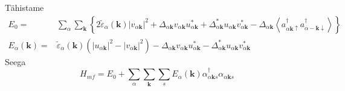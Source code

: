 \documentclass[class=article, crop=false]{standalone}
\begin{document}
Tähistame
\begin{equation}\label{key}
	\begin{split}
		E_{0} = & \sum_{ \alpha} \sum_{ \mathbf{k}} \left\lbrace 2 \tilde{ \varepsilon}_{ \alpha} ( \mathbf{k}) \left| v_{ \alpha \mathbf{k}} \right|^{2} + \Delta_{ \alpha \mathbf{k}} v_{ \alpha \mathbf{k}} u_{ \alpha \mathbf{k}}^{ \ast} + \Delta_{ \alpha \mathbf{k}}^{ \ast} u_{ \alpha \mathbf{k}} v_{ \alpha \mathbf{k}}^{ \ast} - \Delta_{ \alpha \mathbf{k}} \left\langle a^{ \dagger}_{ \alpha \mathbf{k} \uparrow} a^{ \dagger}_{ \alpha -\mathbf{k} \downarrow} \right\rangle \right\rbrace  \\
		E_{ \alpha} ( \mathbf{k}) = & \tilde{ \varepsilon}_{ \alpha} ( \mathbf{k}) \left( \left| u_{ \alpha \mathbf{k}} \right|^{2} - \left| v_{ \alpha \mathbf{k}} \right|^{2} \right) - \Delta_{ \alpha \mathbf{k}} v_{ \alpha \mathbf{k}} u_{ \alpha \mathbf{k}}^{ \ast} - \Delta_{ \alpha \mathbf{k}}^{ \ast} u_{ \alpha \mathbf{k}} v_{ \alpha \mathbf{k}}^{ \ast}
	\end{split}
\end{equation}
Seega
\begin{equation}\label{key}
	H_{mf} = E_{0} + \sum_{ \alpha} \sum_{ \mathbf{k}} \sum_{s} E_{ \alpha} ( \mathbf{k}) \alpha_{ \alpha \mathbf{k} s}^{ \dagger} \alpha_{ \alpha \mathbf{k} s}
\end{equation}
\end{document}
